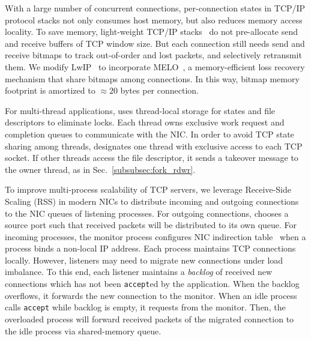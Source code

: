 
With a large number of concurrent connections, per-connection states in TCP/IP protocol stacks not only consumes host memory, but also reduces memory access locality. To save memory, light-weight TCP/IP stacks~\cite{dunkels2001design} do not pre-allocate send and receive buffers of TCP window size. But each connection still needs send and receive bitmaps to track out-of-order and lost packets, and selectively retransmit them. We modify LwIP~\cite{dunkels2001design} to incorporate MELO~\cite{lu2017memory}, a memory-efficient loss recovery mechanism that share bitmaps among connections. In this way, bitmap memory footprint is amortized to $\approx20$ bytes per connection.

For multi-thread applications, \libipc{} uses thread-local storage for states and file descriptors to eliminate locks. Each thread owns exclusive work request and completion queues to communicate with the NIC. In order to avoid TCP state sharing among threads, \libipc{} designates one thread with exclusive access to each TCP socket. If other threads access the file descriptor, it sends a takeover message to the owner thread, as in Sec.~\ref{subsubsec:fork_rdwr}.

To improve multi-process scalability of TCP servers, we leverage Receive-Side Scaling (RSS) in modern NICs to distribute incoming and outgoing connections to the NIC queues of listening processes. For outgoing connections, \libipc{} chooses a source port such that received packets will be distributed to its own queue. For incoming processes, the monitor process configures NIC indirection table~\cite{mellanox} when a process binds a non-local IP address. Each process maintains TCP connections locally. However, listeners may need to migrate new connections under load imbalance. To this end, each listener maintains a \textit{backlog} of received new connections which has not been \texttt{accept}ed by the application. When the backlog overflows, it forwards the new connection to the monitor. When an idle process calls \texttt{accept} while backlog is empty, it requests from the monitor. Then, the overloaded process will forward received packets of the migrated connection to the idle process via shared-memory queue.

